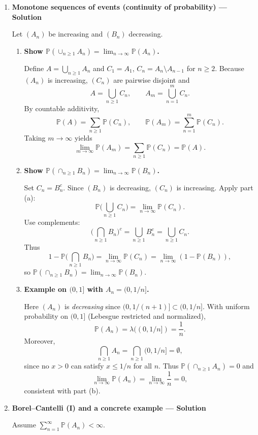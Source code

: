 \documentclass[11pt]{article}
\begin{document}
\begin{enumerate}
\item \textbf{Monotone sequences of events (continuity of probability) — Solution}

Let $(A_n)$ be increasing and $(B_n)$ decreasing.

\begin{enumerate}[label=(\alph*)]
\item \textbf{Show $\mathbb{P}(\cup_{n\ge1}A_n)=\lim_{n\to\infty}\mathbb{P}(A_n)$.}

Define $A=\bigcup_{n\ge1}A_n$ and $C_1=A_1$, $C_n=A_n\setminus A_{n-1}$ for $n\ge2$.
Because $(A_n)$ is increasing, $(C_n)$ are pairwise disjoint and
\[
A=\bigcup_{n\ge1}C_n,
\qquad
A_m=\bigcup_{n=1}^m C_n.
\]
By countable additivity,
\[
\mathbb{P}(A)=\sum_{n\ge1}\mathbb{P}(C_n),
\qquad
\mathbb{P}(A_m)=\sum_{n=1}^m\mathbb{P}(C_n).
\]
Taking $m\to\infty$ yields
\[
\lim_{m\to\infty}\mathbb{P}(A_m)=\sum_{n\ge1}\mathbb{P}(C_n)=\mathbb{P}(A).
\]

\item \textbf{Show $\mathbb{P}(\cap_{n\ge1}B_n)=\lim_{n\to\infty}\mathbb{P}(B_n)$.}

Set $C_n=B_n^c$. Since $(B_n)$ is decreasing, $(C_n)$ is increasing. Apply part (a):
\[
\mathbb{P}\Big(\bigcup_{n\ge1}C_n\Big)=\lim_{n\to\infty}\mathbb{P}(C_n).
\]
Use complements:
\[
\Big(\bigcap_{n\ge1}B_n\Big)^c=\bigcup_{n\ge1}B_n^c=\bigcup_{n\ge1}C_n.
\]
Thus
\[
1-\mathbb{P}\Big(\bigcap_{n\ge1}B_n\Big)
=
\lim_{n\to\infty}\mathbb{P}(C_n)
=
\lim_{n\to\infty}(1-\mathbb{P}(B_n)),
\]
so $\mathbb{P}(\cap_{n\ge1}B_n)=\lim_{n\to\infty}\mathbb{P}(B_n)$.

\item \textbf{Example on $(0,1]$ with $A_n=(0,1/n]$.}

Here $(A_n)$ is \emph{decreasing} since $(0,1/(n+1)]\subset(0,1/n]$.
With uniform probability on $(0,1]$ (Lebesgue restricted and normalized),
\[
\mathbb{P}(A_n)=\lambda((0,1/n])=\frac{1}{n}.
\]
Moreover,
\[
\bigcap_{n\ge1}A_n=\bigcap_{n\ge1}(0,1/n]=\emptyset,
\]
since no $x>0$ can satisfy $x\le 1/n$ for all $n$.
Thus $\mathbb{P}(\cap_{n\ge1}A_n)=0$ and
\[
\lim_{n\to\infty}\mathbb{P}(A_n)=\lim_{n\to\infty}\frac1n=0,
\]
consistent with part (b).
\end{enumerate}

\item \textbf{Borel--Cantelli (I) and a concrete example — Solution}

Assume $\sum_{n=1}^\infty\mathbb{P}(A_n)<\infty$.


\end{enumerate}
\end{document}
